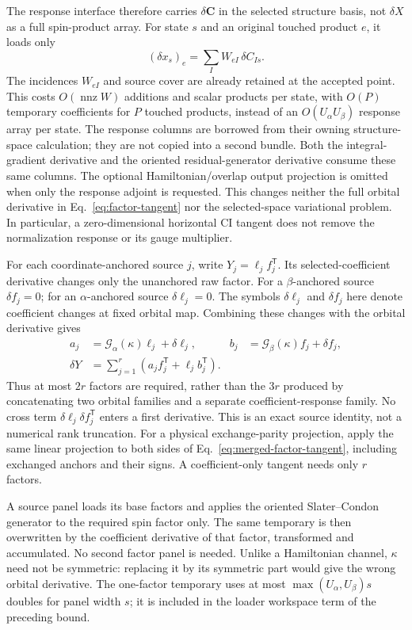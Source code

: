\documentclass[11pt,a4paper]{article}
\newcommand{\Tr}{^{\mathsf T}}
\begin{document}
The response interface therefore carries $\delta\mathbf C$ in the selected
structure basis, not $\delta X$ as a full spin-product array. For state $s$
and an original touched product $e$, it loads only
\begin{equation}
 (\delta x_s)_e=\sum_I W_{eI}\,\delta C_{Is}.
\end{equation}
The incidences $W_{eI}$ and source cover are already retained at the accepted
point. This costs $O(\operatorname{nnz}W)$ additions and scalar products per
state, with $O(P)$ temporary coefficients for $P$ touched products, instead
of an $O(U_\alpha U_\beta)$ response array per state. The response columns
are borrowed from their owning structure-space calculation; they are not
copied into a second bundle. Both the integral-gradient derivative and
the oriented residual-generator derivative consume these same columns.
The optional Hamiltonian/overlap output projection is omitted when only
the response adjoint is requested. This changes neither the full orbital
derivative in Eq.~\eqref{eq:factor-tangent} nor the selected-space variational
problem. In particular, a zero-dimensional horizontal CI tangent does not
remove the normalization response or its gauge multiplier.

For each coordinate-anchored source $j$, write $Y_j=\ell_j f_j\Tr$.
Its selected-coefficient derivative changes only the unanchored raw factor.
For a $\beta$-anchored source $\delta f_j=0$; for an $\alpha$-anchored
source $\delta\ell_j=0$. The symbols $\delta\ell_j$ and $\delta f_j$ here
denote coefficient changes at fixed orbital map. Combining these changes
with the orbital derivative gives
\begin{align}
 a_j&=\mathcal G_\alpha(\kappa)\ell_j+\delta\ell_j,&
 b_j&=\mathcal G_\beta(\kappa)f_j+\delta f_j,\\
 \delta Y&=\sum_{j=1}^{r}\left(a_j f_j\Tr+\ell_j b_j\Tr\right).
 \label{eq:merged-factor-tangent}
\end{align}
Thus at most $2r$ factors are required, rather than the $3r$ produced by
concatenating two orbital families and a separate coefficient-response
family. No cross term $\delta\ell_j\delta f_j\Tr$ enters a first derivative.
This is an exact source identity, not a numerical rank truncation. For a
physical exchange-parity projection, apply the same linear projection to
both sides of Eq.~\eqref{eq:merged-factor-tangent}, including exchanged
anchors and their signs. A coefficient-only tangent needs only $r$ factors.

A source panel loads its base factors and applies
the oriented Slater--Condon generator to the required spin factor only.
The same temporary is then overwritten by the coefficient derivative of
that factor, transformed and accumulated. No second factor panel is needed.
Unlike a Hamiltonian channel, $\kappa$ need not be symmetric: replacing it by
its symmetric part would give the wrong orbital derivative. The one-factor
temporary uses at most $\max(U_\alpha,U_\beta)s$ doubles for panel width $s$;
it is included in the loader workspace term of the preceding bound.
\end{document}
